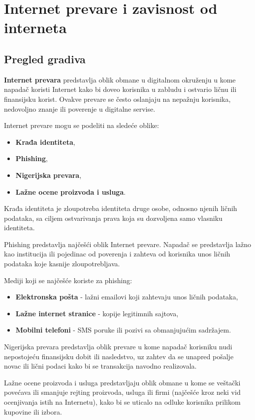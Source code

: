 \documentclass[a4paper, 12pt]{article}
\begin{document}
\section{Internet prevare i zavisnost od interneta}
\subsection{Pregled gradiva}
\textbf{Internet prevara} predstavlja oblik obmane u digitalnom okruženju u kome napadač
koristi Internet kako bi doveo korisnika u zabludu i ostvario
ličnu ili finansijsku korist. Ovakve prevare se često oslanjaju na nepažnju korisnika,
nedovoljno znanje ili poverenje u digitalne servise.

Internet prevare mogu se podeliti na sledeće oblike:
\begin{itemize}
    \item \textbf{Krađa identiteta},
    \item \textbf{Phishing},
    \item \textbf{Nigerijska prevara},
    \item \textbf{Lažne ocene proizvoda i usluga}.
\end{itemize}

Krađa identiteta je zloupotreba identiteta druge osobe, odnosno njenih ličnih podataka, sa
ciljem ostvarivanja prava koja su dozvoljena samo vlasniku identiteta.

Phishing predstavlja najčešći oblik Internet prevare. Napadač se predstavlja lažno kao institucija ili pojedinac od poverenja i zahteva od korisnika unos ličnih podataka koje kasnije zloupotrebljava.

Mediji koji se najčešće koriste za phishing:
\begin{itemize}
    \item \textbf{Elektronska pošta} - lažni emailovi koji zahtevaju unos ličnih podataka,
    \item \textbf{Lažne internet stranice} - kopije legitimnih sajtova,
    \item \textbf{Mobilni telefoni} - SMS poruke ili pozivi sa obmanjujućim sadržajem.
\end{itemize}

Nigerijska prevara predstavlja oblik prevare u kome napadač korisniku nudi
nepostojeću finansijsku dobit ili nasledstvo, uz zahtev da se unapred pošalje novac
ili lični podaci kako bi se transakcija navodno realizovala.

Lažne ocene proizvoda i usluga predstavljaju oblik obmane u kome se veštački
povećava ili smanjuje rejting proizvoda, usluga ili firmi (najčešće kroz neki vid ocenjivanja istih na Internetu), kako bi se uticalo na odluke korisnika prilikom kupovine ili izbora.
\end{document}
